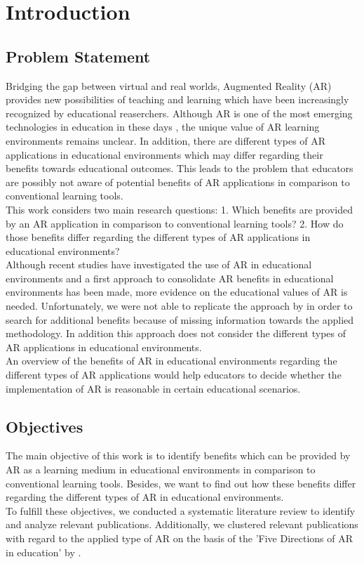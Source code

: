 \section{Introduction}
\label{sec:Introduction}
\subsection{Problem Statement}
\label{subsec:ProblemStatement}
Bridging the gap between virtual and real worlds, Augmented Reality (AR) provides new possibilities of teaching and learning which have been increasingly recognized by educational reaserchers. \autocite [cf.][41]{Wu.2013} Although AR is one of the most emerging technologies in education in these days \autocite [cf.][21]{Johnson.2010}, the unique value of AR learning environments remains unclear.\autocite[\label{fn:Wu_2013_48}cf.][48]{Wu.2013} In addition, there are different types of AR applications in educational environments which may differ regarding their benefits towards educational outcomes. \autocite [cf.][126-130]{Yuen.2011} This leads to the problem that educators are possibly not aware of potential benefits of AR applications in comparison to conventional learning tools. \\
This work considers two main research questions: 1. Which benefits are provided by an AR application in comparison to conventional learning tools? 2. How do those benefits differ regarding the different types of AR applications in educational environments? \\
Although recent studies have investigated the use of AR in educational environments \autocite {Wu.2013}\mulcit\autocite {Lee.2012} and a first approach to consolidate AR benefits in educational environments has been made, \autocite{Radu.2014} more evidence on the educational values of AR is needed. Unfortunately, we were not able to replicate the approach by \cite{Radu.2014} in order to search for additional benefits because of missing information towards the applied methodology. In addition this approach does not consider the different types of AR applications in educational environments.\\
An overview of the benefits of AR in educational environments regarding the different types of AR applications would help educators to decide whether the implementation of AR is reasonable in certain educational scenarios.\\
\subsection{Objectives}
\label{subsec:Objectives}
The main objective of this work is to identify benefits which can be provided by AR as a learning medium in educational environments in comparison to conventional learning tools. Besides, we want to find out how these benefits differ regarding the different types of AR in educational environments. \\
To fulfill these objectives, we conducted a systematic literature review to identify and analyze relevant publications. Additionally, we clustered relevant publications with regard to the applied type of AR on the basis of the 'Five Directions of AR in education' by \cite{Yuen.2011}.
